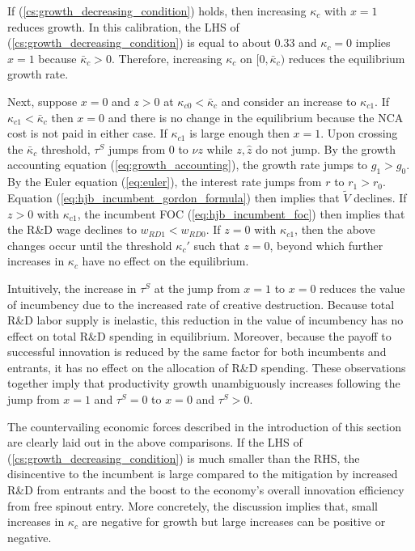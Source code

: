 \documentclass[11pt,english]{article}
\begin{document}
If (\ref{cs:growth_decreasing_condition}) holds, then increasing $\kappa_c$ with $x = 1$ reduces growth. In this calibration, the LHS of (\ref{cs:growth_decreasing_condition}) is equal to about 0.33 and $\kappa_c = 0$ implies $x = 1$ because $\bar{\kappa}_c > 0$. Therefore, increasing $\kappa_c$ on $[0,\bar{\kappa}_c)$ reduces the equilibrium growth rate.

Next, suppose $x = 0$ and $z > 0$ at $\kappa_{c0} < \bar{\kappa}_c$ and consider an increase to $\kappa_{c1}$. If $\kappa_{c1} < \bar{\kappa}_c$ then $x = 0$ and there is no change in the equilibrium because the NCA cost is not paid in either case. If $\kappa_{c1}$ is large enough then $x = 1$. Upon crossing the $\bar{\kappa}_c$ threshold, $\tau^S$ jumps from $0$ to $\nu z$ while $z,\hat{z}$ do not jump. By the growth accounting equation (\ref{eq:growth_accounting}), the growth rate jumps to $g_1 > g_0$. By the Euler equation (\ref{eq:euler}), the interest rate jumps from $r$ to $r_1>r_0$. Equation (\ref{eq:hjb_incumbent_gordon_formula}) then implies that $\tilde{V}$ declines. If $z > 0$ with $\kappa_{c1}$, the incumbent FOC (\ref{eq:hjb_incumbent_foc}) then implies that the R\&D wage declines to $w_{RD1} < w_{RD0}$. If $z = 0$ with $\kappa_{c1}$, then the above changes occur until the threshold $\kappa_{c}'$ such that $z = 0$, beyond which further increases in $\kappa_c$ have no effect on the equilibrium. 

Intuitively, the increase in $\tau^S$ at the jump from $x = 1$ to $x = 0$ reduces the value of incumbency due to the increased rate of creative destruction. Because total R\&D labor supply is inelastic, this reduction in the value of incumbency has no effect on total R\&D spending in equilibrium. Moreover, because the payoff to successful innovation is reduced by the same factor for both incumbents and entrants, it has no effect on the allocation of R\&D spending. These observations together imply that productivity growth unambiguously increases following the jump from $x = 1$ and $\tau^S = 0$ to $x = 0$ and $\tau^S > 0$.  

The countervailing economic forces described in the introduction of this section are clearly laid out in the above comparisons. If the LHS of (\ref{cs:growth_decreasing_condition}) is much smaller than the RHS, the disincentive to the incumbent is large compared to the mitigation by increased R\&D from entrants and the boost to the economy's overall innovation efficiency from free spinout entry. More concretely, the discussion implies that, small increases in $\kappa_c$ are negative for growth but large increases can be positive or negative.
\end{document}
